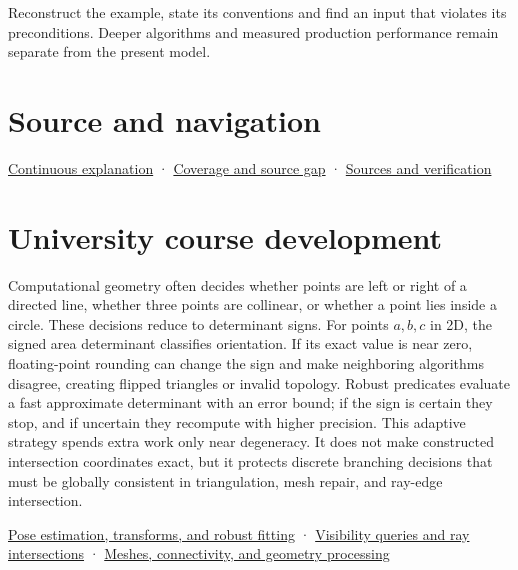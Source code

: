 Reconstruct the example, state its conventions and find an input that violates its preconditions. Deeper algorithms and measured production performance remain separate from the present model.

\section{Source and navigation}\label{appendix-da478be01d02-source-and-navigation}

\href{Continuous\%20Notes/Computing\%20Foundations\%20-\%20From\%20Bits\%20to\%20C++\%20and\%20Systems\%20APIs\#Keep\%20the\%20promises\%20visible\%20while\%20moving\%20between\%20representations}{Continuous explanation} · \hyperref[appendix-fd090d982a15-phase-7---parts-601-700]{Coverage and source gap} · \hyperref[appendix-a103e7846d21-phase-7---source-analysis-and-verification]{Sources and verification}

\section{University course development}\label{appendix-da478be01d02-university-course-development}

Computational geometry often decides whether points are left or right of a directed line, whether three points are collinear, or whether a point lies inside a circle. These decisions reduce to determinant signs. For points \(a,b,c\) in 2D, the signed area determinant classifies orientation. If its exact value is near zero, floating-point rounding can change the sign and make neighboring algorithms disagree, creating flipped triangles or invalid topology. Robust predicates evaluate a fast approximate determinant with an error bound; if the sign is certain they stop, and if uncertain they recompute with higher precision. This adaptive strategy spends extra work only near degeneracy. It does not make constructed intersection coordinates exact, but it protects discrete branching decisions that must be globally consistent in triangulation, mesh repair, and ray-edge intersection.

\href{Continuous\%20Notes/University\%20-\%20Worlds,\%20Images\%20and\%20Inference\%20-\%20Graphics,\%20Vision\%20and\%20Photography\#Pose\%20estimation,\%20transforms,\%20and\%20robust\%20fitting}{Pose estimation, transforms, and robust fitting} · \href{Continuous\%20Notes/University\%20-\%20Worlds,\%20Images\%20and\%20Inference\%20-\%20Graphics,\%20Vision\%20and\%20Photography\#Visibility\%20queries\%20and\%20ray\%20intersections}{Visibility queries and ray intersections} · \href{Continuous\%20Notes/University\%20-\%20Worlds,\%20Images\%20and\%20Inference\%20-\%20Graphics,\%20Vision\%20and\%20Photography\#Meshes,\%20connectivity,\%20and\%20geometry\%20processing}{Meshes, connectivity, and geometry processing}
